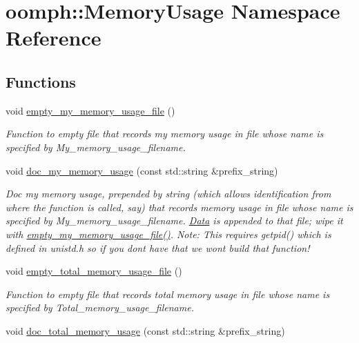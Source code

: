 \hypertarget{namespaceoomph_1_1MemoryUsage}{}\section{oomph\+:\+:Memory\+Usage Namespace Reference}
\label{namespaceoomph_1_1MemoryUsage}
\subsection*{Functions}
\begin{DoxyCompactItemize}
\item 
void \hyperlink{namespaceoomph_1_1MemoryUsage_aadcb42d5c4ca8099981d75b2d5adcd96}{empty\+\_\+my\+\_\+memory\+\_\+usage\+\_\+file} ()
\begin{DoxyCompactList}\small\item\em Function to empty file that records my memory usage in file whose name is specified by My\+\_\+memory\+\_\+usage\+\_\+filename. \end{DoxyCompactList}\item 
void \hyperlink{namespaceoomph_1_1MemoryUsage_a43f39ca6f2e6040903ec86b46eb760dd}{doc\+\_\+my\+\_\+memory\+\_\+usage} (const std\+::string \&prefix\+\_\+string)
\begin{DoxyCompactList}\small\item\em Doc my memory usage, prepended by string (which allows identification from where the function is called, say) that records memory usage in file whose name is specified by My\+\_\+memory\+\_\+usage\+\_\+filename. \hyperlink{classoomph_1_1Data}{Data} is appended to that file; wipe it with \hyperlink{namespaceoomph_1_1MemoryUsage_aadcb42d5c4ca8099981d75b2d5adcd96}{empty\+\_\+my\+\_\+memory\+\_\+usage\+\_\+file()}. Note\+: This requires getpid() which is defined in unistd.\+h so if you don\textquotesingle{}t have that we won\textquotesingle{}t build that function! \end{DoxyCompactList}\item 
void \hyperlink{namespaceoomph_1_1MemoryUsage_a8a0031773893f06aac876985e38940e4}{empty\+\_\+total\+\_\+memory\+\_\+usage\+\_\+file} ()
\begin{DoxyCompactList}\small\item\em Function to empty file that records total memory usage in file whose name is specified by Total\+\_\+memory\+\_\+usage\+\_\+filename. \end{DoxyCompactList}\item 
void \hyperlink{namespaceoomph_1_1MemoryUsage_a216dececd7087625de8e2211216cd861}{doc\+\_\+total\+\_\+memory\+\_\+usage} (const std\+::string \&prefix\+\_\+string)

\end{DoxyCompactItemize}
